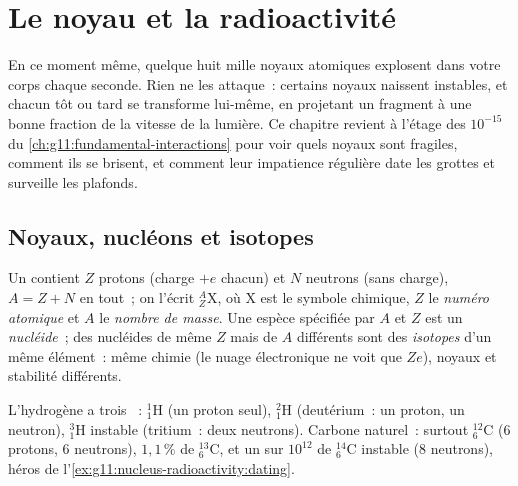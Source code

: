 \chapter{Le noyau et la radioactivité}\label{ch:g11:nucleus-radioactivity}

En ce moment même, quelque huit mille noyaux atomiques explosent dans
votre corps chaque seconde. Rien ne les attaque~: certains noyaux
naissent instables, et chacun tôt ou tard se transforme lui-même, en
projetant un fragment à une bonne fraction de la vitesse de la lumière.
Ce chapitre revient à l'étage des $10^{-15}$~ du
\cref{ch:g11:fundamental-interactions} pour voir quels noyaux sont
fragiles, comment ils se brisent, et comment leur impatience régulière
date les grottes et surveille les plafonds.

\section{Noyaux, nucléons et isotopes}

\begin{definition}\label{def:g11:nucleus-radioactivity:notation}
Un  contient $Z$ protons
(charge $+e$ chacun) et $N$ neutrons (sans charge), $A = Z + N$
 en tout~; on l'écrit
${}^{A}_{Z}\mathrm{X}$, où $\mathrm X$ est le symbole chimique, $Z$ le
\emph{numéro atomique} et $A$ le \emph{nombre de
masse}. Une espèce spécifiée par $A$ et $Z$ est
un \emph{nucléide}~; des nucléides de même $Z$ mais de
$A$ différents sont des \emph{isotopes} d'un même
élément~: même chimie (le nuage électronique ne voit que $Ze$), noyaux
et stabilité différents.
\end{definition}

\begin{example}\label{ex:g11:nucleus-radioactivity:hc}
L'hydrogène a trois ~:
${}^{1}_{1}\mathrm{H}$ (un proton seul), ${}^{2}_{1}\mathrm{H}$
(deutérium~: un proton, un neutron), ${}^{3}_{1}\mathrm{H}$ instable
(tritium~: deux neutrons). Carbone naturel~: surtout
${}^{12}_{6}\mathrm{C}$ ($6$ protons, $6$ neutrons), $1{,}1\,\%$ de
${}^{13}_{6}\mathrm{C}$, et un 
sur $10^{12}$ de ${}^{14}_{6}\mathrm{C}$ instable ($8$ neutrons), héros
de l'\cref{ex:g11:nucleus-radioactivity:dating}.
\end{example}

